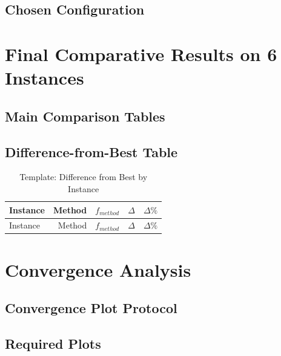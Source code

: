 \documentclass[12pt,a4paper]{report}
\begin{document}
\section{Chosen Configuration}

\chapter{Final Comparative Results on 6 Instances}
\section{Main Comparison Tables}

\section{Difference-from-Best Table}

\begin{longtable}{lrrrr}
\caption{Template: Difference from Best by Instance}\label{tab:diff_from_best}\\
\toprule
Instance & Method & $f_{method}$ & $\Delta$ & $\Delta\%$ \\
\midrule
\endfirsthead
\toprule
Instance & Method & $f_{method}$ & $\Delta$ & $\Delta\%$ \\
\midrule
\endhead
\bottomrule
\end{longtable}

\chapter{Convergence Analysis}
\section{Convergence Plot Protocol}

\section{Required Plots}
\end{document}
